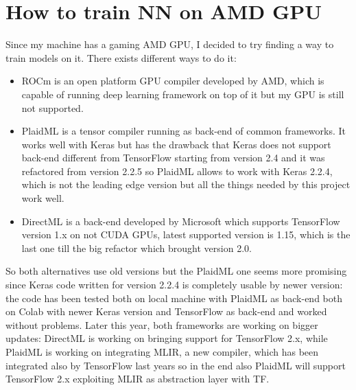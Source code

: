 \documentclass{article}
\begin{document}

\section{How to train NN on AMD GPU}
\label{sec:AMD}

Since my machine has a gaming AMD GPU, I decided to try finding a way to train models on it. There exists different ways to do it: 

\begin{itemize}
	\item ROCm \cite{rocm} is an open platform GPU compiler developed by AMD, which is capable of running deep learning framework on top of it but my GPU is still not supported.
	\item PlaidML \cite{Plaid} is a tensor compiler running as back-end of common frameworks. It works well with Keras but has the drawback that Keras does not support back-end different from TensorFlow starting from version 2.4 and it was refactored from version 2.2.5 so PlaidML allows to work with Keras 2.2.4, which is not the leading edge version but all the things needed by this project work well.
	\item DirectML \cite{directML} is a back-end developed by Microsoft which supports TensorFlow version 1.x on not CUDA GPUs, latest supported version is 1.15, which is the last one till the big refactor which brought version 2.0. 
\end{itemize}

So both alternatives use old versions but the PlaidML one seems more promising since Keras code written for version 2.2.4 is completely usable by newer version: the code has been tested both on local machine with PlaidML as back-end both on Colab with newer Keras version and TensorFlow as back-end and worked without problems.\newline
Later this year, both frameworks are working on bigger updates: DirectML is working on bringing support for TensorFlow 2.x, while PlaidML is working on integrating MLIR, a new compiler, which has been integrated also by TensorFlow last years so in the end also PlaidML will support TensorFlow 2.x exploiting MLIR as abstraction layer with TF.

\end{document}
